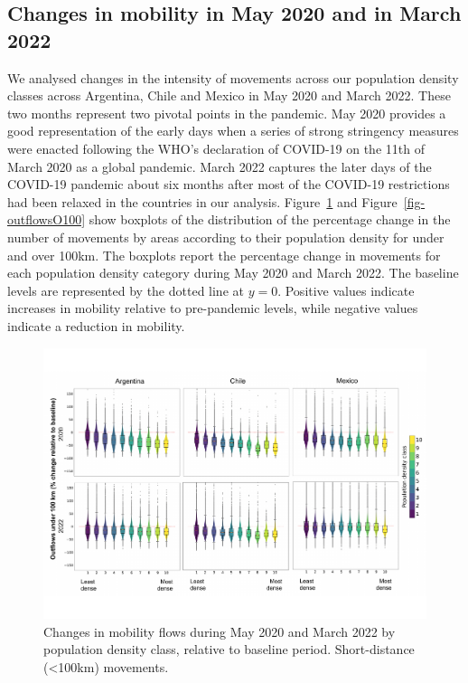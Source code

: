 \documentclass[
  11pt,
]{article}
\begin{document}
\hypertarget{changes-in-mobility-in-may-2020-and-in-march-2022}{%
\subsection{Changes in mobility in May 2020 and in March
2022}\label{changes-in-mobility-in-may-2020-and-in-march-2022}}

We analysed changes in the intensity of movements across our population
density classes across Argentina, Chile and Mexico in May 2020 and March
2022. These two months represent two pivotal points in the pandemic. May
2020 provides a good representation of the early days when a series of
strong stringency measures were enacted following the WHO's declaration
of COVID-19 on the 11th of March 2020 as a global pandemic. March 2022
captures the later days of the COVID-19 pandemic about six months after
most of the COVID-19 restrictions had been relaxed in the countries in
our analysis. Figure~\ref{fig-outflowsU100} and
Figure~\ref{fig-outflowsO100} show boxplots of the distribution of the
percentage change in the number of movements by areas according to their
population density for under and over 100km. The boxplots report the
percentage change in movements for each population density category
during May 2020 and March 2022. The baseline levels are represented by
the dotted line at \(y=0\). Positive values indicate increases in
mobility relative to pre-pandemic levels, while negative values indicate
a reduction in mobility.

\begin{figure}

{\centering \includegraphics{../outputs/all_countries_outflows_u100_minus_Colombia_lighter.pdf}

}

\caption{\label{fig-outflowsU100}Changes in mobility flows during May
2020 and March 2022 by population density class, relative to baseline
period. Short-distance (\textless100km) movements.}

\end{figure}
\end{document}
